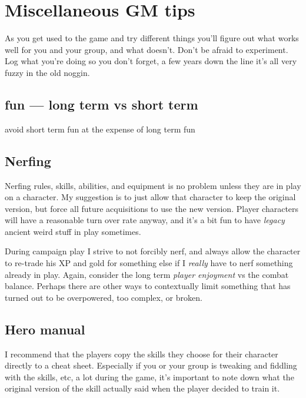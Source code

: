 
\section*{Miscellaneous GM tips}

As you get used to the game and try different things you'll figure out what works well for you and your group, and what doesn't. Don't be afraid to experiment. Log what you're doing so you don't forget, a few years down the line it's all very fuzzy in the old noggin.


\subsection*{fun --- long term vs short term}
\todo avoid short term fun at the expense of long term fun


\subsection*{Nerfing}
Nerfing rules, skills, abilities, and equipment is no problem unless they are in play on a character. My suggestion is to just allow that character to keep the original version, but force all future acquisitions to use the new version. Player characters will have a reasonable turn over rate anyway, and it's a bit fun to have \emph{legacy} ancient weird stuff in play sometimes.

During campaign play I strive to not forcibly nerf, and always allow the character to re-trade his XP and gold for something else if I \emph{really} have to nerf something already in play. Again, consider the long term \emph{player enjoyment} vs the combat balance. Perhaps there are other ways to contextually limit something that has turned out to be overpowered, too complex, or broken.


\subsection*{Hero manual}
I recommend that the players copy the skills they choose for their character directly to a cheat sheet. Especially if you or your group is tweaking and fiddling with the skills, etc, a lot during the game, it's important to note down what the original version of the skill actually said when the player decided to train it.

